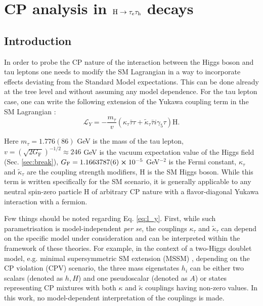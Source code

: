 \chapter{CP analysis in $\text{H} \to \tau_\mathrm{e}\tau_\mathrm{h}$ decays}\label{sec:cp-etau}
\section{Introduction}\label{sec:cp-intro}

In order to probe the CP nature of the interaction between the Higgs boson and tau leptons one needs to modify the SM Lagrangian in a way to incorporate effects deviating from the Standard Model expectations. This can be done already at the tree level and without assuming any model dependence. For the tau lepton case, one can write the following extension of the Yukawa coupling term in the SM Lagrangian \cite{Gritsan:2016hjl}:
\begin{equation}\label{eq:l_y}
    \mathcal{L}_Y = -\frac{m_\tau}{v}(\kappa_\tau\bar{\tau}\tau + \tilde{\kappa}_\tau\bar{\tau}i\gamma_5\tau) \text{H}.
\end{equation}

Here $m_\tau = 1.776(86)$ GeV is the mass of the tau lepton, $v=\left(\sqrt{2G_\text{F}}\right)^{-1/2} \approx 246$ GeV is the vacuum expectation value of the Higgs field (Sec. \ref{sec:break}), $G_\text{F} = 1.1663787(6) \cross 10^{-5}$ GeV$^{-2}$ is the Fermi constant, $\kappa_\tau$ and $\tilde{\kappa}_\tau$ are the coupling strength modifiers, H is the SM Higgs boson. While this term is written specifically for the SM scenario, it is generally applicable to any neutral spin-zero particle H of arbitrary CP nature with a flavor-diagonal Yukawa interaction with a fermion. 

Few things should be noted regarding Eq. \ref{eq:l_y}. First, while such parametrisation is model-independent \textit{per se}, the couplings $\kappa_\tau$ and $\tilde{\kappa}_\tau$ can depend on the specific model under consideration and can be interpreted within the framework of these theories. For example, in the context of a two-Higgs doublet model, e.g. minimal supersymmetric SM
extension (MSSM) \cite{Accomando:2006ga}, depending on the CP violation (CPV) scenario, the three mass eigenstates $h_i$ can be either two scalars (denoted as $h, H$) and one pseudoscalar (denoted as $A$) or states representing CP mixtures with both $\kappa$ and $\tilde{\kappa}$ couplings having non-zero values. In this work, no model-dependent interpretation of the couplings is made.    

